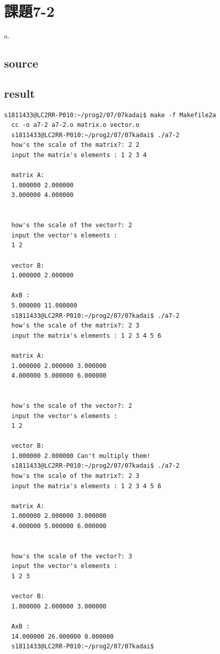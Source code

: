 \documentclass[10pt,a4paper]{jsarticle}
\begin{document}

\section{課題7-2}
\noindent a.
\subsection{source}








\subsection{result}
\begin{lstlisting}[basicstyle=\ttfamily\footnotesize,frame=single,breaklines=tr\
  ue]
  s1811433@LC2RR-P010:~/prog2/07/07kadai$ make -f Makefile2a
  cc -o a7-2 a7-2.o matrix.o vector.o
  s1811433@LC2RR-P010:~/prog2/07/07kadai$ ./a7-2
  how's the scale of the matrix?: 2 2
  input the matrix's elements : 1 2 3 4

  matrix A:
  1.000000 2.000000
  3.000000 4.000000


  how's the scale of the vector?: 2
  input the vector's elements :
  1 2

  vector B:
  1.000000 2.000000

  AxB :
  5.000000 11.000000
  s1811433@LC2RR-P010:~/prog2/07/07kadai$ ./a7-2
  how's the scale of the matrix?: 2 3
  input the matrix's elements : 1 2 3 4 5 6

  matrix A:
  1.000000 2.000000 3.000000
  4.000000 5.000000 6.000000


  how's the scale of the vector?: 2
  input the vector's elements :
  1 2

  vector B:
  1.000000 2.000000 Can't multiply them!
  s1811433@LC2RR-P010:~/prog2/07/07kadai$ ./a7-2
  how's the scale of the matrix?: 2 3
  input the matrix's elements : 1 2 3 4 5 6

  matrix A:
  1.000000 2.000000 3.000000
  4.000000 5.000000 6.000000


  how's the scale of the vector?: 3
  input the vector's elements :
  1 2 3

  vector B:
  1.000000 2.000000 3.000000

  AxB :
  14.000000 26.000000 0.000000
  s1811433@LC2RR-P010:~/prog2/07/07kadai$
\end{lstlisting}
\end{document}
